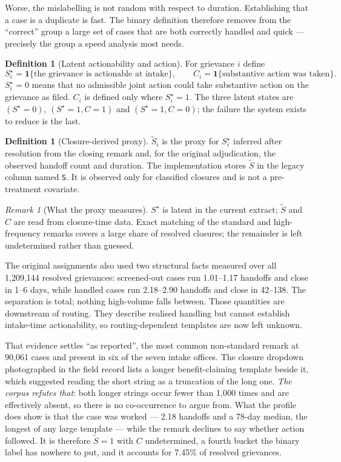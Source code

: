 \documentclass[11pt,a4paper]{article}
\theoremstyle{plain}
\theoremstyle{definition}
\newtheorem{definition}[theorem]{Definition}
\theoremstyle{remark}
\newtheorem*{remark*}{Remark}
\newcommand{\one}[1]{\mathbf 1\{#1\}}
\newcommand{\code}[1]{\texttt{\small #1}}
\newcommand{\Sstar}{S^{\star}}
\newcommand{\Sproxy}{\widetilde S}
\begin{document}
Worse, the mislabelling is not random with respect to duration. Establishing that a case is a
duplicate is fast. The binary definition therefore removes from the ``correct'' group a large
set of cases that are both correctly handled and quick --- precisely the group a speed analysis
most needs.

\begin{definition}[Latent actionability and action]\label{def:threestate}
For grievance $i$ define
\[
\Sstar_i=\one{\text{the grievance is actionable at intake}},\qquad
C_i=\one{\text{substantive action was taken}}.
\]
$\Sstar_i=0$ means that no admissible joint action could take substantive action on the
grievance as filed. $C_i$ is defined only where $\Sstar_i=1$. The three latent states are
$(\Sstar=0)$, $(\Sstar=1,C=1)$ and $(\Sstar=1,C=0)$; the failure the system exists to reduce is
the last.
\end{definition}

\begin{definition}[Closure-derived proxy]\label{def:Sproxy}
$\Sproxy_i$ is the proxy for $\Sstar_i$ inferred after resolution from the closing remark and,
for the original adjudication, the observed handoff count and duration. The implementation
stores $\Sproxy$ in the legacy column named \code{S}. It is observed only for classified
closures and is not a pre-treatment covariate.
\end{definition}

\begin{remark*}[What the proxy measures]
$\Sstar$ is latent in the current extract; $\Sproxy$ and $C$ are read from closure-time data.
Exact matching of the standard and high-frequency remarks covers a large share of resolved
closures; the remainder is left undetermined rather than guessed.

The original assignments also used two structural facts measured over all 1{,}209{,}144 resolved
grievances:
screened-out cases run 1.01--1.17 handoffs and close in 1--6 days, while handled cases run
2.18--2.90 handoffs and close in 42--138. The separation is total; nothing high-volume falls
between. Those quantities are downstream of routing. They describe realised handling but cannot
establish intake-time actionability, so routing-dependent templates are now left unknown.

That evidence settles ``as reported'', the most common non-standard remark at 90{,}061 cases and
present in six of the seven intake offices. The closure dropdown photographed in the field record
lists a longer benefit-claiming template beside it, which suggested reading the short string as a
truncation of the long one. \emph{The corpus refutes that}: both longer strings occur fewer than
1{,}000 times and are effectively absent, so there is no co-occurrence to argue from. What the
profile does show is that the case was worked --- 2.18 handoffs and a 78-day median, the longest
of any large template --- while the remark declines to say whether action followed. It is
therefore $\Sproxy=1$ with $C$ undetermined, a fourth bucket the binary label has nowhere to put, and
it accounts for 7.45\% of resolved grievances.
\end{remark*}
\end{document}
